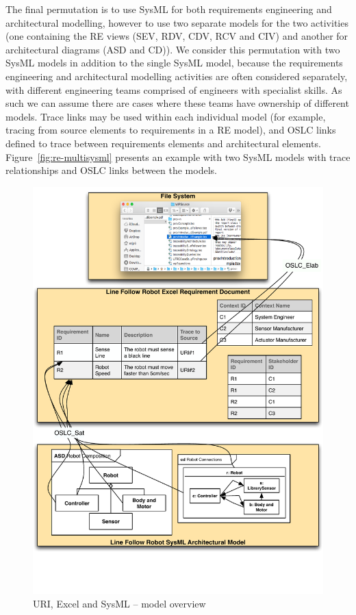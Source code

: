 \begin{description}
The final permutation is to use SysML for both requirements engineering and architectural modelling, however to use two separate models for the two activities (one containing the RE views (SEV, RDV, CDV, RCV and CIV) and another for architectural diagrams (ASD and CD)). We consider this permutation with two SysML models in addition to the single SysML model, because the requirements engineering and architectural modelling activities are often considered separately, with different engineering teams comprised of engineers with specialist skills. As such we can assume there are cases where these teams have ownership of different models.
Trace links may be used within each individual model (for example, tracing from source elements to requirements in a RE model), and OSLC links defined to trace between requirements elements and architectural elements. Figure~\ref{fig:re-multisysml} presents an example with two SysML models with trace relationships and OSLC links between the models.

\begin{figure}
	\centering
	\includegraphics[scale=0.65]{figures/RE_3}
\caption{URI, Excel and SysML -- model overview}
\label{fig:re-uri-excel-sysml}
\end{figure}


\end{description}
